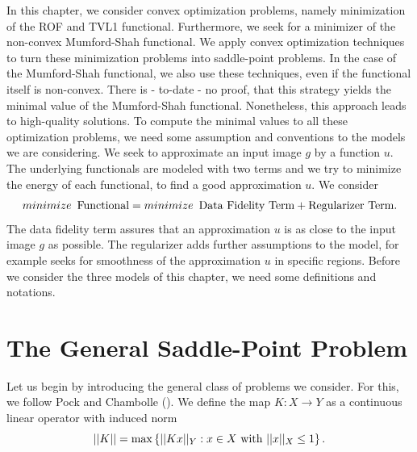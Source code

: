 \documentclass{scrreprt}
\begin{document}
    In this chapter, we consider convex optimization problems, namely minimization of the ROF and TVL1 functional. Furthermore, we seek for a minimizer of the non-convex Mumford-Shah functional. We apply convex optimization techniques to turn these minimization problems into saddle-point problems. In the case of the Mumford-Shah functional, we also use these techniques, even if the functional itself is non-convex. There is - to-date - no proof, that this strategy yields the minimal value of the Mumford-Shah functional. Nonetheless, this approach leads to high-quality solutions. To compute the minimal values to all these optimization problems, we need some assumption and conventions to the models we are considering. We seek to approximate an input image $g$ by a function $u$. The underlying functionals are modeled with two terms and we try to minimize the energy of each functional, to find a good approximation $u$. We consider
        $$
            minimize \,\,\, \textnormal{Functional} = minimize \,\,\, \textnormal{Data Fidelity Term} + \textnormal{Regularizer Term}.
        $$
    The data fidelity term assures that an approximation $u$ is as close to the input image $g$ as possible. The regularizer adds further assumptions to the model, for example seeks for smoothness of the approximation $u$ in specific regions. Before we consider the three models of this chapter, we need some definitions and notations.
    
    \section{The General Saddle-Point Problem} %
    \label{sec:the_general_saddle_point_problem}
        
        Let us begin by introducing the general class of problems we consider. For this, we follow Pock and Chambolle (\cite{Chambolle10afirst-order}). We define the map $K: X \longrightarrow Y$ as a continuous linear operator with induced norm
            $$
                ||K|| = \max \left\{ ||Kx||_{Y} : x \in X \,\, \textnormal{with} \,\, ||x||_{X} \le 1 \right\}.
            $$
\end{document}
